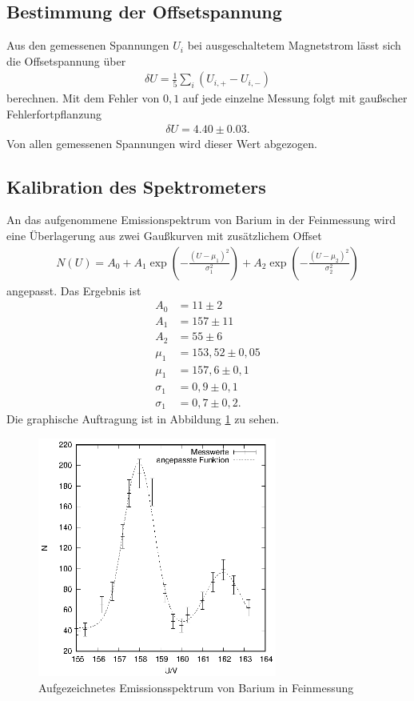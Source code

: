 \subsection{Bestimmung der Offsetspannung}
Aus den gemessenen Spannungen $U_i$ bei ausgeschaltetem Magnetstrom lässt sich die Offsetspannung über
\begin{align*}
  \delta U=\frac{1}{5}\sum_i (U_{i,+}-U_{i,-})
\end{align*}
berechnen. Mit dem Fehler von $0,1$ auf jede einzelne Messung folgt mit gaußscher Fehlerfortpflanzung
\begin{align*}
  \delta U=4.40\pm 0.03.
\end{align*}
Von allen gemessenen Spannungen wird dieser Wert abgezogen.

\subsection{Kalibration des Spektrometers}
An das aufgenommene Emissionspektrum von Barium in der Feinmessung wird eine Überlagerung aus zwei Gaußkurven mit zusätzlichem Offset
\begin{align*}
  N(U)=A_0+A_1\exp \left(-\frac{(U-\mu_1)^2}{\sigma_1^2}\right) +A_2\exp\left(-\frac{(U-\mu_2)^2}{\sigma_2^2} \right)
\end{align*}
angepasst. Das Ergebnis ist
\begin{align*}
  A_0&=11\pm 2\\
  A_1&=157\pm 11\\
  A_2&=55\pm 6\\
  \mu_1&=153,52 \pm 0,05\\
  \mu_1&=157,6 \pm 0,1\\
  \sigma_1&=0,9 \pm 0,1\\
  \sigma_1&=0,7 \pm 0,2.
\end{align*}
Die graphische Auftragung ist in Abbildung \ref{fig:ba_fein} zu sehen.
\begin{figure}[h]
  \centering
  \includegraphics[width=0.7\textwidth]{data/Ba_fein.eps}
  \caption{Aufgezeichnetes Emissionsspektrum von Barium in Feinmessung}
  \label{fig:ba_fein}
\end{figure}

